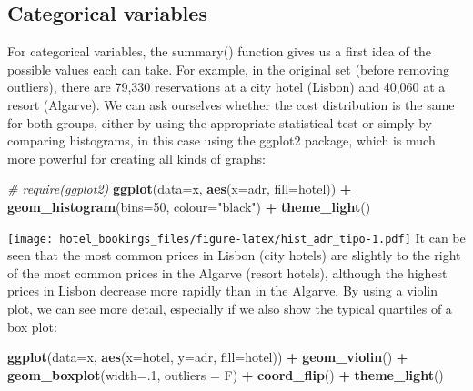 \documentclass[
]{article}
\newenvironment{Shaded}{\begin{snugshade}}{\end{snugshade}}
\newcommand{\AttributeTok}[1]{\textcolor[rgb]{0.13,0.29,0.53}{#1}}
\newcommand{\CommentTok}[1]{\textcolor[rgb]{0.56,0.35,0.01}{\textit{#1}}}
\newcommand{\DecValTok}[1]{\textcolor[rgb]{0.00,0.00,0.81}{#1}}
\newcommand{\FunctionTok}[1]{\textcolor[rgb]{0.13,0.29,0.53}{\textbf{#1}}}
\newcommand{\NormalTok}[1]{#1}
\newcommand{\SpecialCharTok}[1]{\textcolor[rgb]{0.81,0.36,0.00}{\textbf{#1}}}
\newcommand{\StringTok}[1]{\textcolor[rgb]{0.31,0.60,0.02}{#1}}
\begin{document}
\subsection{Categorical variables}\label{categorical-variables}

For categorical variables, the summary() function gives us a first idea
of the possible values each can take. For example, in the original set
(before removing outliers), there are 79,330 reservations at a city
hotel (Lisbon) and 40,060 at a resort (Algarve). We can ask ourselves
whether the cost distribution is the same for both groups, either by
using the appropriate statistical test or simply by comparing
histograms, in this case using the ggplot2 package, which is much more
powerful for creating all kinds of graphs:

\begin{Shaded}
\begin{Highlighting}[]
\CommentTok{\# require(ggplot2)}
\FunctionTok{ggplot}\NormalTok{(}\AttributeTok{data=}\NormalTok{x, }\FunctionTok{aes}\NormalTok{(}\AttributeTok{x=}\NormalTok{adr, }\AttributeTok{fill=}\NormalTok{hotel)) }\SpecialCharTok{+} 
  \FunctionTok{geom\_histogram}\NormalTok{(}\AttributeTok{bins=}\DecValTok{50}\NormalTok{, }\AttributeTok{colour=}\StringTok{"black"}\NormalTok{) }\SpecialCharTok{+}
  \FunctionTok{theme\_light}\NormalTok{()}
\end{Highlighting}
\end{Shaded}

\texttt{[image: hotel\_bookings\_files/figure-latex/hist\_adr\_tipo-1.pdf]}
It can be seen that the most common prices in Lisbon (city hotels) are
slightly to the right of the most common prices in the Algarve (resort
hotels), although the highest prices in Lisbon decrease more rapidly
than in the Algarve. By using a violin plot, we can see more detail,
especially if we also show the typical quartiles of a box plot:

\begin{Shaded}
\begin{Highlighting}[]
\FunctionTok{ggplot}\NormalTok{(}\AttributeTok{data=}\NormalTok{x, }\FunctionTok{aes}\NormalTok{(}\AttributeTok{x=}\NormalTok{hotel, }\AttributeTok{y=}\NormalTok{adr, }\AttributeTok{fill=}\NormalTok{hotel)) }\SpecialCharTok{+} 
  \FunctionTok{geom\_violin}\NormalTok{() }\SpecialCharTok{+} \FunctionTok{geom\_boxplot}\NormalTok{(}\AttributeTok{width=}\NormalTok{.}\DecValTok{1}\NormalTok{, }\AttributeTok{outliers =}\NormalTok{ F) }\SpecialCharTok{+}
  \FunctionTok{coord\_flip}\NormalTok{() }\SpecialCharTok{+} 
  \FunctionTok{theme\_light}\NormalTok{()}
\end{Highlighting}
\end{Shaded}
\end{document}
